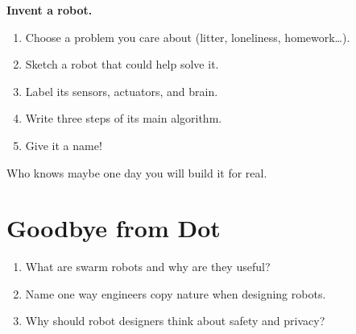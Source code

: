 
\sectionrule

\begin{tryit}
  \textbf{Invent a robot.}
  \begin{enumerate}
    \item Choose a problem you care about (litter, loneliness, homework\ldots).
    \item Sketch a robot that could help solve it.
    \item Label its sensors, actuators, and brain.
    \item Write three steps of its main algorithm.
    \item Give it a name!
  \end{enumerate}
  Who knows \textemdash{} maybe one day you will build it for real.
\end{tryit}

\sectionrule

\section*{Goodbye from Dot}


\sectionrule


\begin{quickcheck}
  \begin{enumerate}
    \item What are swarm robots and why are they useful?
    \item Name one way engineers copy nature when designing robots.
    \item Why should robot designers think about safety and privacy?
  \end{enumerate}
\end{quickcheck}

